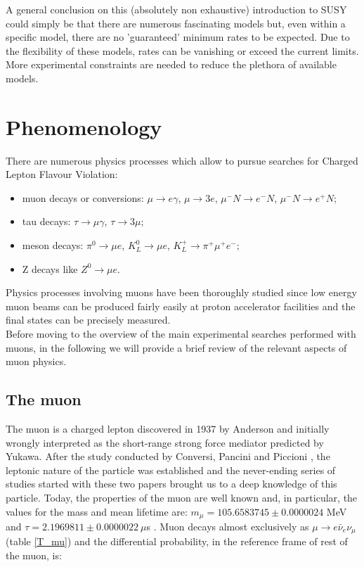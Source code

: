 \documentclass[12pt,a4paper,openright, oneside, titlepage]{book} %
\begin{document}
\noindent A general conclusion on this (absolutely non exhaustive) introduction to SUSY could simply be that there are numerous fascinating models but, even within a specific model, there are no 'guaranteed' minimum rates to be expected. 
Due to the flexibility of these models, rates can be vanishing or exceed the current limits.
More experimental constraints are needed to reduce the plethora of available models.

\section{Phenomenology}
There are numerous physics processes which allow to pursue searches for Charged Lepton Flavour Violation:
\begin{itemize}
\item muon decays or conversions: 
$\mu\rightarrow e \gamma$, $\mu\rightarrow 3e$, $\mu^- N\rightarrow e^- N$, $\mu^- N\rightarrow e^+ N$; 
\item tau decays: $\tau\rightarrow \mu \gamma$, $\tau\rightarrow 3\mu$;
\item meson decays: $\pi^0\rightarrow \mu e$, $K_L^0\rightarrow\mu e$, $K_L^+\rightarrow \pi^+ \mu^+ e^-$;
\item Z decays like $Z^0\rightarrow\mu e$.
\end{itemize}
Physics processes involving muons have been thoroughly studied 
since low energy muon beams can be produced fairly easily 
at proton accelerator facilities and the final states can be precisely measured.\\
Before moving to the overview of the main experimental searches performed 
with muons, in the following we will provide a brief review 
of the relevant aspects of muon physics.

\subsection{The muon}
\label{muon}
The muon is a charged lepton discovered in 1937 by Anderson \cite{Anderson} 
and initially wrongly interpreted as the short-range strong force mediator predicted by Yukawa. 
After the study conducted by Conversi, Pancini and Piccioni \cite{ConvPancPicc}, 
the leptonic nature of the particle was established and the never-ending series of studies started 
with these two papers brought us to a deep knowledge of this particle. 
Today, the properties of the muon are well known and, in particular, the values for the mass and  mean lifetime are: 
$m_\mu = 105.6583745 \pm 0.0000024 $ MeV and $\tau =  2.1969811 \pm 0.0000022 \ \mu$s \cite{PDG}.
Muon decays almost exclusively as $\mu\rightarrow e\bar{\nu}_e\nu_{\mu}$ (table \ref{T_mu}) and the differential probability, in the reference frame of rest of the muon, is:
\end{document}
